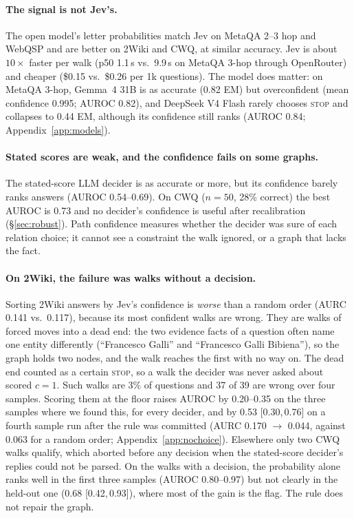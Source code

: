 \documentclass[11pt]{article}
\newcommand{\stopop}{\textsc{stop}}
\newcommand{\ci}[2]{{\scriptsize[#1,\,#2]}}
\begin{document}
\paragraph{The signal is not Jev's.} The open model's letter probabilities match Jev
on MetaQA 2--3 hop and WebQSP and are better on 2Wiki and CWQ, at similar accuracy. Jev
is about $10\times$ faster per walk (p50 1.1\,s vs.\ 9.9\,s on MetaQA 3-hop through
OpenRouter) and cheaper (\$0.15 vs.\ \$0.26 per 1k questions). The model does matter: on
MetaQA 3-hop, Gemma~4 31B is as accurate (0.82 EM) but overconfident (mean confidence
0.995; AUROC 0.82), and DeepSeek V4 Flash rarely chooses \stopop{} and collapses to 0.44
EM, although its confidence still ranks (AUROC 0.84; Appendix~\ref{app:models}).

\paragraph{Stated scores are weak, and the confidence fails on some graphs.} The
stated-score LLM decider is as accurate or more, but its confidence barely ranks
answers (AUROC 0.54--0.69). On CWQ ($n=50$, 28\% correct) the best AUROC is 0.73 and no
decider's confidence is useful after recalibration (\S\ref{sec:robust}). Path
confidence measures whether the decider was sure of each relation choice; it cannot see
a constraint the walk ignored, or a graph that lacks the fact.

\paragraph{On 2Wiki, the failure was walks without a decision.} Sorting 2Wiki answers by
Jev's confidence is \emph{worse} than a random order (AURC 0.141 vs.\ 0.117), because
its most confident walks are wrong. They are walks of forced moves into a dead end: the
two evidence facts of a question often name one entity differently (``Francesco Galli''
and ``Francesco Galli Bibiena''), so the graph holds two nodes, and the walk reaches
the first with no way on. The dead end counted as a certain \stopop{}, so a walk the
decider was never asked about scored $c = 1$. Such walks are 3\% of questions and 37 of
39 are wrong over four samples. Scoring them at the floor raises AUROC by 0.20--0.35 on
the three samples where we found this, for every decider, and by 0.53 \ci{0.30}{0.76}
on a fourth sample run after the rule was committed (AURC 0.170 $\to$ 0.044, against
0.063 for a random order; Appendix~\ref{app:nochoice}). Elsewhere only two CWQ walks
qualify, which aborted before any decision when the stated-score decider's replies
could not be parsed. On the walks with a decision, the probability alone ranks well in
the first three samples (AUROC 0.80--0.97) but not clearly in the held-out one (0.68
\ci{0.42}{0.93}), where most of the gain is the flag. The rule does not repair the graph.
\end{document}
